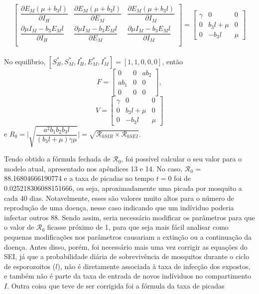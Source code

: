 \begin{itemize}
$$\begin{bmatrix}
\dfrac{\partial E_M (\mu + b_3 l)}{\partial I_H} & \dfrac{\partial E_M (\mu + b_3 l)}{\partial E_M} & \dfrac{\partial E_M (\mu + b_3 l)}{\partial I_M}\\
\dfrac{\partial \mu I_M - b_3 E_M l}{\partial I_H} & \dfrac{\partial \mu I_M - b_3 E_M l}{\partial E_M} & \dfrac{\partial \mu I_M - b_3 E_M l}{\partial I_M}\\
\end{bmatrix} = 
\begin{bmatrix}
\gamma & 0 & 0\\
0 & b_3l+\mu & 0\\
0 & -b_3l & \mu
\end{bmatrix}$$
\\No equilíbrio, $[S_H^*, S_M^*, I_H^*, E_M^*, I_M^*] = [1,1,0,0,0]$, então $$F=\begin{bmatrix}
0 & 0 & ab_2\\
ab_1 & 0 & 0\\
0 & 0 & 0
\end{bmatrix},$$
$$V = \begin{bmatrix}
\gamma & 0 & 0\\
0 & b_3l+\mu & 0\\
0 & -b_3l & \mu
\end{bmatrix}$$ 
e $R_0 = \Big | \sqrt{\dfrac{a^2 b_1 b_2 b_3 l}{(b_3 l + \mu)\gamma \mu}}\Big | = 
\sqrt{\mathcal{R}_{0 SIR} \times \mathcal{R}_{0 SEI}}$. 

\end{itemize}
Tendo obtido a fórmula fechada de $\mathcal{R}_0$, foi possível calcular o seu valor para o 
modelo atual, apresentado nos apêndices 13 e 14. No caso, $\mathcal{R}_0$ = 88.16804666190774
e a taxa de picadas no tempo $t=0$ foi de 0.025218306088151666, ou seja, aproximadamente 
uma picada por mosquito a cada 40 dias. Notavelmente, esses são valores muito altos para 
o número de reprodução de uma doença, nesse caso indicando que um indíviduo poderia infectar 
outros 88. Sendo assim, seria necessário modificar os parâmetros para que o valor de 
$\mathcal{R}_0$ ficasse próximo de 1, para que seja mais fácil analisar como pequenas 
modificações nos parâmetros causariam a extinção ou a continuação da doença. 
Antes disso, porém, 
foi necessário mais uma vez corrigir as equações do SEI, já que a probabilidade diária de 
sobrevivência de mosquitos durante o ciclo de esporozoitos ($l$), não é diretamente associada 
à taxa de infecção dos expostos, e também não é parte da taxa de entrada de novos indíviduos 
no compartimento $I$. Outra coisa que teve de ser corrigida foi a fórmula da taxa de picadas 
